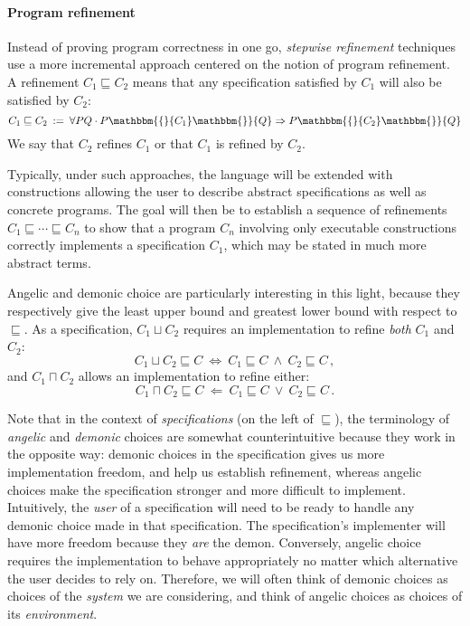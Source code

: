 \documentclass[format=sigplan,authordraft]{acmart}
\newcommand{\htr}[3]{{ {#1} \mathbbm{\{} {#2} \mathbbm{\}} {#3} }}
\begin{document}

\paragraph{Program refinement} %

Instead of proving program correctness in one go,
\emph{stepwise refinement} techniques use a more incremental approach
centered on the notion of program refinement.
A refinement $C_1 \sqsubseteq C_2$
means that any specification satisfied by $C_1$
will also be satisfied by $C_2$:
\[
    C_1 \sqsubseteq C_2 \: := \:
    \forall P Q \cdot
      \htr{P}{C_1}{Q} \Rightarrow
      \htr{P}{C_2}{Q}
\]
We say that $C_2$ refines $C_1$
or that $C_1$ is refined by $C_2$.

Typically,
under such approaches,
the language will be extended with constructions
allowing the user to describe
abstract specifications as well as
concrete programs.
The goal will then be to establish
a sequence of refinements
$C_1 \sqsubseteq \cdots \sqsubseteq C_n$
to show that a program $C_n$ involving
only executable constructions
correctly implements a specification $C_1$,
which may be stated in much more abstract terms.

Angelic and demonic choice
are particularly interesting in this light,
because they respectively give the
least upper bound and greatest lower bound
with respect to $\sqsubseteq$.
As a specification, $C_1 \sqcup C_2$
requires an implementation to refine
\emph{both} $C_1$ and $C_2$:
\[
    C_1 \sqcup C_2 \sqsubseteq C \: \Leftrightarrow \:
    C_1 \sqsubseteq C \: \wedge \: C_2 \sqsubseteq C \,,
\]
and $C_1 \sqcap C_2$
allows an implementation to refine
either:
\[
    C_1 \sqcap C_2 \sqsubseteq C \: \Leftarrow \:
    C_1 \sqsubseteq C \: \vee \: C_2 \sqsubseteq C \,.
\]

Note that in the context of \emph{specifications}
(on the left of $\sqsubseteq$),
the terminology of \emph{angelic} and \emph{demonic}
choices are somewhat counterintuitive
because they work in the opposite way:
demonic choices in the specification gives us more
implementation freedom,
and help us establish refinement,
whereas angelic choices make the specification
stronger and more difficult to implement.
Intuitively,
the \emph{user} of a specification
will need to be ready to handle any demonic choice
made in that specification.
The specification's implementer
will have more freedom because they \emph{are} the demon.
Conversely,
angelic choice requires the implementation
to behave appropriately
no matter which alternative the user decides to rely on.
Therefore,
we will often think of demonic choices as
choices of the \emph{system} we are considering,
and think of angelic choices as
choices of its \emph{environment}.
\end{document}
